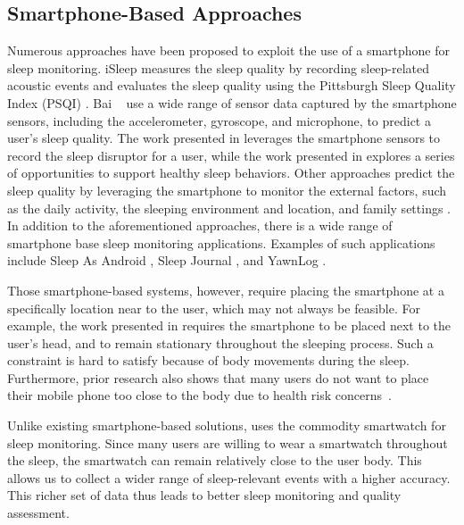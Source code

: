\subsection{Smartphone-Based Approaches}
Numerous approaches have been proposed to exploit the use of a smartphone for sleep monitoring. iSleep \cite{hao2013isleep} measures the
sleep quality by recording sleep-related acoustic events and evaluates the sleep quality using the Pittsburgh Sleep Quality Index (PSQI)
\cite{carpenter1998psychometric}. Bai \etal~\cite{bai2012will} use a wide range of sensor data captured by the smartphone sensors,
including the accelerometer, gyroscope, and microphone, to predict a user's sleep quality. The work presented in \cite{kay2012lullaby}
leverages the smartphone sensors to record the sleep disruptor for a user, while the work presented in \cite{choe2011opportunities}
explores a series of opportunities to support healthy sleep behaviors. Other approaches predict the sleep quality by leveraging the
smartphone to monitor the external factors, such as the daily activity, the sleeping environment and location, and family settings
\cite{chen2013unobtrusive,zhang2013real}. In addition to the aforementioned approaches, there is a wide range of smartphone base sleep
monitoring applications. Examples of such applications include Sleep As Android \cite{SleepAndroid}, Sleep Journal \cite{SleepJournal}, and
YawnLog \cite{YawnLog}.

Those smartphone-based systems, however, require placing the smartphone at a specifically location near to the user, which may not always
be feasible. For example, the work presented in \cite{gu2016sleep} requires the smartphone to be placed next to the user's head, and to
remain stationary throughout the sleeping process. Such a constraint is hard to satisfy because of body movements during the sleep.
Furthermore, prior research also shows that many users do not want to place their mobile phone too close to the body due to health risk
concerns~\cite{StepHealth,Quorasleep}.

Unlike existing smartphone-based solutions, \systemname uses the commodity smartwatch for sleep monitoring. Since many users are willing to
wear a smartwatch throughout the sleep, the smartwatch can remain relatively close to the user body. This allows us to collect a wider
range of sleep-relevant events with a higher accuracy. This richer set of data thus leads to better sleep monitoring and quality
assessment.

